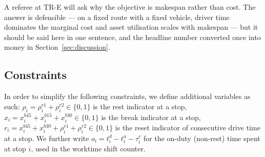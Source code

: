\begin{acmt}
A referee at TR-E will ask why the objective is makespan rather than cost. The
answer is defensible --- on a fixed route with a fixed vehicle, driver time
dominates the marginal cost and asset utilisation scales with makespan --- but it
should be said here in one sentence, and the headline number converted once into
money in Section~\ref{sec:discussion}.
\end{acmt}

\subsection{Constraints}
In order to simplify the following constraints, we define additional variables as such: $\rho_i = \rho_i^{r1} + \rho_i^{r2} \in \{0,1\}$ is the rest indicator at a stop, $x_i = x_i^{b45} + x_i^{b15} + x_i^{b30} \in \{0,1\}$ is the break indicator at a stop, $r_i = x_i^{b45} + x_i^{b30} + \rho_i^{r1} + \rho_i^{r2} \in \{0,1\}$ is the reset indicator of consecutive drive time at a stop. We further write $o_i=t^d_i - t^a_i - \tau_i^r $ for the on-duty (non-rest) time spent at stop $i$, used in the worktime shift counter.

